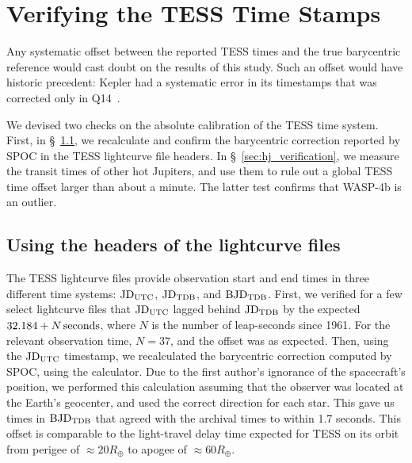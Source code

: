\documentclass[12pt,twocolumn,tighten]{aastex62}
\begin{document}




                            
 


\appendix

\section{Verifying the TESS Time Stamps}
\label{sec:verify_tess}

Any systematic offset between the reported TESS
times and the true barycentric reference would cast doubt on the
results of this study.  Such an offset would have historic precedent:
Kepler had a systematic error in its timestamps that was corrected
only in Q14~\citep[][Section 3.4]{kepler_DR19_2013}.

We devised two checks on the absolute calibration of the TESS time
system.  First, in \S~\ref{sec:headers}, we recalculate and confirm
the barycentric correction reported by SPOC in the TESS lightcurve
file headers.  In \S~\ref{sec:hj_verification}, we measure the transit times
of other hot Jupiters, and use them
to rule out a global TESS time offset larger than about a minute.
The latter test confirms that WASP-4b is an outlier.

\subsection{Using the headers of the lightcurve files}
\label{sec:headers}

The TESS lightcurve files provide observation start and end times in
three different time systems: ${\rm JD}_{\rm UTC}$, ${\rm JD}_{\rm
TDB}$, and ${\rm BJD}_{\rm TDB}$.
First, we verified for a few select lightcurve files that ${\rm
JD}_{\rm UTC}$ lagged behind ${\rm JD}_{\rm TDB}$ by the expected
$32.184 + N\,{\rm seconds}$, where $N$ is the number of leap-seconds
since 1961. For the relevant observation time, $N=37$, and the offset
was as expected.
Then, using the ${\rm JD}_{\rm UTC}$ timestamp, we recalculated the
barycentric correction computed by SPOC, using the
\citealt{eastman_achieving_2010} calculator.  Due to the first
author's ignorance of the spacecraft's position, we performed this
calculation assuming that the observer was located at the Earth's
geocenter, and used the correct direction for each star.  This gave us
times in ${\rm BJD}_{\rm TDB}$ that agreed with the archival times to
within 1.7 seconds.  This offset is comparable to the light-travel
delay time expected for TESS on its orbit from perigee of $\approx
20R_\oplus$ to apogee of $\approx 60R_\oplus$.
\end{document}
